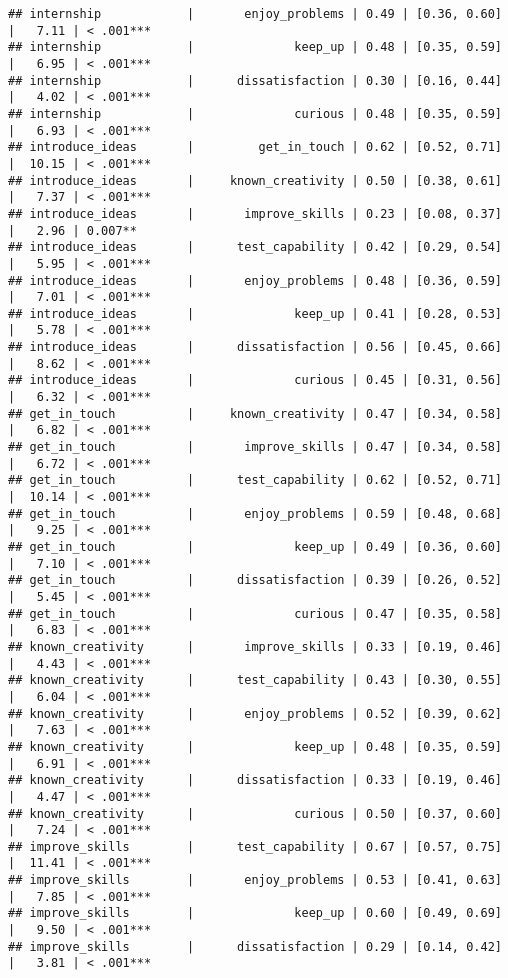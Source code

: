 \documentclass[
]{article}
\begin{document}
\begin{verbatim}
## internship            |       enjoy_problems | 0.49 | [0.36, 0.60] |   7.11 | < .001***
## internship            |              keep_up | 0.48 | [0.35, 0.59] |   6.95 | < .001***
## internship            |      dissatisfaction | 0.30 | [0.16, 0.44] |   4.02 | < .001***
## internship            |              curious | 0.48 | [0.35, 0.59] |   6.93 | < .001***
## introduce_ideas       |         get_in_touch | 0.62 | [0.52, 0.71] |  10.15 | < .001***
## introduce_ideas       |     known_creativity | 0.50 | [0.38, 0.61] |   7.37 | < .001***
## introduce_ideas       |       improve_skills | 0.23 | [0.08, 0.37] |   2.96 | 0.007**  
## introduce_ideas       |      test_capability | 0.42 | [0.29, 0.54] |   5.95 | < .001***
## introduce_ideas       |       enjoy_problems | 0.48 | [0.36, 0.59] |   7.01 | < .001***
## introduce_ideas       |              keep_up | 0.41 | [0.28, 0.53] |   5.78 | < .001***
## introduce_ideas       |      dissatisfaction | 0.56 | [0.45, 0.66] |   8.62 | < .001***
## introduce_ideas       |              curious | 0.45 | [0.31, 0.56] |   6.32 | < .001***
## get_in_touch          |     known_creativity | 0.47 | [0.34, 0.58] |   6.82 | < .001***
## get_in_touch          |       improve_skills | 0.47 | [0.34, 0.58] |   6.72 | < .001***
## get_in_touch          |      test_capability | 0.62 | [0.52, 0.71] |  10.14 | < .001***
## get_in_touch          |       enjoy_problems | 0.59 | [0.48, 0.68] |   9.25 | < .001***
## get_in_touch          |              keep_up | 0.49 | [0.36, 0.60] |   7.10 | < .001***
## get_in_touch          |      dissatisfaction | 0.39 | [0.26, 0.52] |   5.45 | < .001***
## get_in_touch          |              curious | 0.47 | [0.35, 0.58] |   6.83 | < .001***
## known_creativity      |       improve_skills | 0.33 | [0.19, 0.46] |   4.43 | < .001***
## known_creativity      |      test_capability | 0.43 | [0.30, 0.55] |   6.04 | < .001***
## known_creativity      |       enjoy_problems | 0.52 | [0.39, 0.62] |   7.63 | < .001***
## known_creativity      |              keep_up | 0.48 | [0.35, 0.59] |   6.91 | < .001***
## known_creativity      |      dissatisfaction | 0.33 | [0.19, 0.46] |   4.47 | < .001***
## known_creativity      |              curious | 0.50 | [0.37, 0.60] |   7.24 | < .001***
## improve_skills        |      test_capability | 0.67 | [0.57, 0.75] |  11.41 | < .001***
## improve_skills        |       enjoy_problems | 0.53 | [0.41, 0.63] |   7.85 | < .001***
## improve_skills        |              keep_up | 0.60 | [0.49, 0.69] |   9.50 | < .001***
## improve_skills        |      dissatisfaction | 0.29 | [0.14, 0.42] |   3.81 | < .001***

\end{verbatim}
\end{document}
